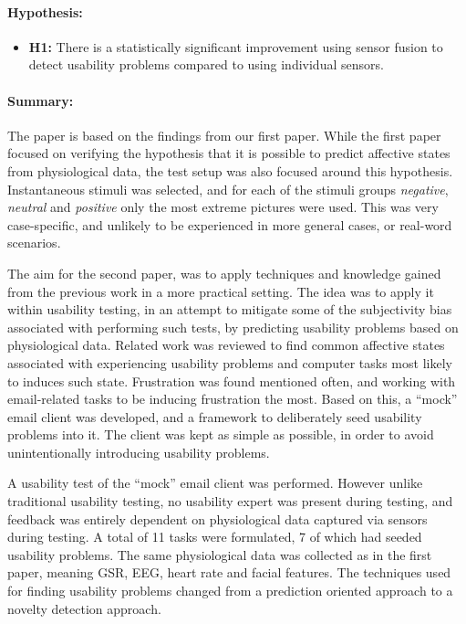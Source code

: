\paragraph{Hypothesis:}
\begin{itemize}
    \item \textbf{H1:} There is a statistically significant improvement using sensor fusion to detect usability problems compared to using individual sensors.
\end{itemize}
\paragraph{Summary:}
The paper is based on the findings from our first paper. While the first paper focused on verifying the hypothesis that
it is possible to predict affective states from physiological data, the test setup was also focused around this
hypothesis.  Instantaneous stimuli was selected, and for each of the stimuli groups \textit{negative}, \textit{neutral}
and \textit{positive} only the most extreme pictures were used.  This was very case-specific, and unlikely to be
experienced in more general cases, or real-word scenarios.

The aim for the second paper, was to apply techniques and knowledge gained from the previous work in a more practical
setting. The idea was to apply it within usability testing, in an attempt to mitigate some of the subjectivity bias
associated with performing such tests, by predicting usability problems based on physiological data. Related work was
reviewed to find common affective states associated with experiencing usability problems and computer tasks most likely
to induces such state. Frustration was found mentioned often, and working with email-related tasks to be inducing
frustration the most. Based on this, a ``mock'' email client was developed, and a framework to deliberately seed
usability problems into it. The client was kept as simple as possible, in order to avoid unintentionally introducing
usability problems.

A usability test of the ``mock'' email client was performed. However unlike traditional usability testing, no usability
expert was present during testing, and feedback was entirely dependent on physiological data captured via sensors during
testing.  A total of 11 tasks were formulated, 7 of which had seeded usability problems.  The same physiological data
was collected as in the first paper, meaning GSR, EEG, heart rate and facial features.  The techniques used for finding
usability problems changed from a prediction oriented approach to a novelty detection approach.

